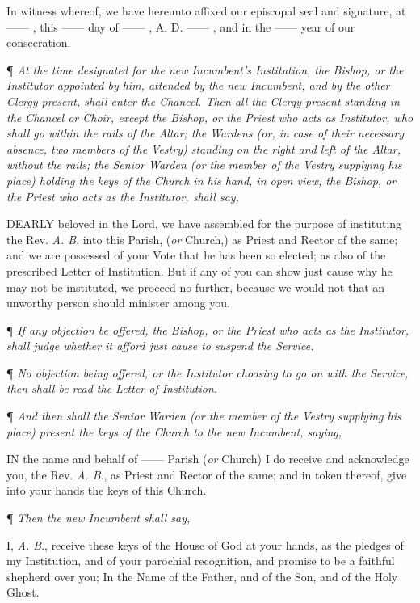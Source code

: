 In witness whereof, we have hereunto affixed our episcopal
seal and signature, at —— , this —— day of ——
, A. D. —— , and in the —— year of our consecration.

¶ \emph{At the time designated for the new Incumbent's Institution,
the Bishop, or the Institutor appointed by him, attended by the new
Incumbent, and by the other Clergy present, shall enter the Chancel.
Then all the Clergy present standing in the Chancel or Choir, except
the Bishop, or the Priest who acts as Institutor, who shall go within
the rails of the Altar; the Wardens (or, in case of their necessary
absence, two members of the Vestry) standing on the right and left of
the Altar, without the rails; the Senior Warden (or the member of the
Vestry supplying his place) holding the keys of the Church in his hand,
in open view, the Bishop, or the Priest who acts as the Institutor,
shall say,}

DEARLY
beloved in the Lord, we have assembled for the purpose of instituting
the Rev. \emph{A. B}. into this Parish, (\emph{or} Church,) as Priest
and Rector of the same; and we are possessed of your Vote that he has
been so elected; as also of the prescribed Letter of Institution. But
if any of you can show just cause why he may not be instituted, we proceed
no further, because we would not that an unworthy person should minister
among you.

¶ \emph{If any objection
be offered, the Bishop, or the Priest who acts as the Institutor, shall
judge whether it afford just cause to suspend the Service.}

¶ \emph{No objection
being offered, or the Institutor choosing to go on with the Service, then
shall be read the Letter of Institution.}

¶ \emph{And then shall
the Senior Warden (or the member of the Vestry supplying his place) present
the keys of the Church to the new Incumbent, saying,}

IN the name and behalf
of —— Parish (\emph{or} Church) I do receive and acknowledge
you, the Rev. \emph{A. B}., as Priest and Rector of the same; and in
token thereof, give into your hands the keys of this Church.

¶ \emph{Then the new Incumbent shall
say,}

I, \emph{A. B}., receive
these keys of the House of God at your hands, as the pledges of my Institution,
and of your parochial recognition, and promise to be a faithful shepherd
over you; In the Name of the Father, and of the Son, and of the Holy Ghost.

